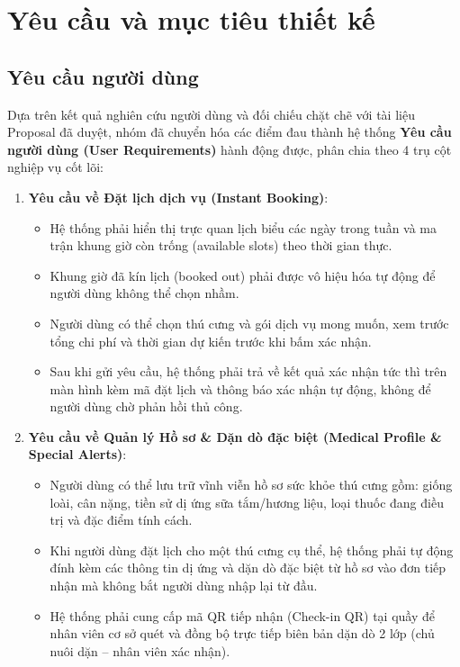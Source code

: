 \section{Yêu cầu và mục tiêu thiết kế}

\subsection{Yêu cầu người dùng}
Dựa trên kết quả nghiên cứu người dùng và đối chiếu chặt chẽ với tài liệu Proposal đã duyệt, nhóm đã chuyển hóa các điểm đau thành hệ thống \textbf{Yêu cầu người dùng (User Requirements)} hành động được, phân chia theo 4 trụ cột nghiệp vụ cốt lõi:
\begin{enumerate}
    \item \textbf{Yêu cầu về Đặt lịch dịch vụ (Instant Booking)}:
    \begin{itemize}
        \item Hệ thống phải hiển thị trực quan lịch biểu các ngày trong tuần và ma trận khung giờ còn trống (available slots) theo thời gian thực.
        \item Khung giờ đã kín lịch (booked out) phải được vô hiệu hóa tự động để người dùng không thể chọn nhầm.
        \item Người dùng có thể chọn thú cưng và gói dịch vụ mong muốn, xem trước tổng chi phí và thời gian dự kiến trước khi bấm xác nhận.
        \item Sau khi gửi yêu cầu, hệ thống phải trả về kết quả xác nhận tức thì trên màn hình kèm mã đặt lịch và thông báo xác nhận tự động, không để người dùng chờ phản hồi thủ công.
    \end{itemize}
    \item \textbf{Yêu cầu về Quản lý Hồ sơ \& Dặn dò đặc biệt (Medical Profile \& Special Alerts)}:
    \begin{itemize}
        \item Người dùng có thể lưu trữ vĩnh viễn hồ sơ sức khỏe thú cưng gồm: giống loài, cân nặng, tiền sử dị ứng sữa tắm/hương liệu, loại thuốc đang điều trị và đặc điểm tính cách.
        \item Khi người dùng đặt lịch cho một thú cưng cụ thể, hệ thống phải tự động đính kèm các thông tin dị ứng và dặn dò đặc biệt từ hồ sơ vào đơn tiếp nhận mà không bắt người dùng nhập lại từ đầu.
        \item Hệ thống phải cung cấp mã QR tiếp nhận (Check-in QR) tại quầy để nhân viên cơ sở quét và đồng bộ trực tiếp biên bản dặn dò 2 lớp (chủ nuôi dặn -- nhân viên xác nhận).
    \end{itemize}

\end{enumerate}
